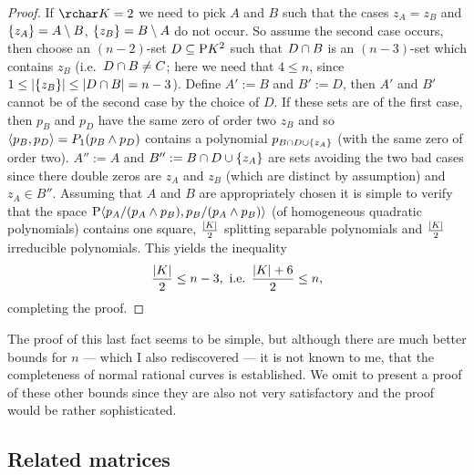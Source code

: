 \begin{proof}
    If $\rchar K = 2$ we need to pick $A$ and $B$ such that the cases 
    $z_A=z_B$ and $\set{z_A}=A\setminus B$, $\set{z_B}=B\setminus A$ do not occur. So assume the second case occurs, then choose an $(n-2)$-set $D\setleq\P K^2$ such that $D\cap B$ is an $(n-3)$-set which contains $z_B$ (i.e.~$D\cap B\not= C$; here we need that $4\leq n$, since $1\leq\card{\set{z_B}}\leq\card{D\setmeet B}=n-3$). Define $A':=B$ and $B':=D$, then $A'$ and $B'$ cannot be of the second case by the choice of $D$. If these sets are of the first case, then $p_B$ and $p_D$ have the same zero of order two $z_B$ and so $\gen{p_B,p_D}=P_1(p_B\meet p_D)$ contains a polynomial $p_{B\setmeet D\setjoin\set{z_A}}$ (with the same zero of order two). $A'':=A$ and $B'':=B\setmeet D\setjoin\set{z_A}$ are sets avoiding the two bad cases since there double zeros are $z_A$ and $z_B$ (which are distinct by assumption) and $z_A\in B''$.
    Assuming that $A$ and $B$ are appropriately chosen it is simple to verify that the space $\P\gen{p_A/(p_A\meet p_B),p_B/(p_A\meet p_B)}$ (of homogeneous quadratic polynomials) contains one square, $\frac{\left\vert{K}\right\vert} 2$ splitting separable polynomials and $\frac{\left\vert{K}\right\vert} 2$ irreducible polynomials.
    This yields the inequality
    $$
    \frac{\left\vert{K}\right\vert} 2 \leq n-3, \text{ i.e. } \frac{\left\vert{K}\right\vert+6} 2\leq n,
    $$
    completing the proof.
\end{proof}

The proof of this last fact seems to be simple, but although there are much better bounds for $n$ --- which I also rediscovered --- it is not known to me, that the completeness of normal rational curves is established.
We omit to present a proof of these other bounds since they are also not very satisfactory and the proof would be rather sophisticated.


\subsection{Related matrices}

